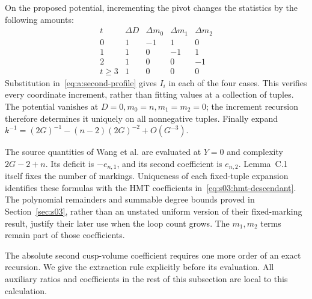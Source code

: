 \begin{prf}
On the proposed potential, incrementing the pivot changes the statistics
by the following amounts:
\[
\begin{array}{c|rrrr}
 t&\Delta D&\Delta m_0&\Delta m_1&\Delta m_2\\\hline
 0&1&-1&1&0\\
 1&1&0&-1&1\\
 2&1&0&0&-1\\
 t\geq3&1&0&0&0
\end{array}
\]
Substitution in~\eqref{eq:a:second-profile} gives $I_i$ in each of
the four cases. This verifies every coordinate increment, rather
than fitting values at a collection of tuples. The potential vanishes
at $D=0,m_0=n,m_1=m_2=0$; the increment recursion therefore determines
it uniquely on all nonnegative tuples. Finally expand
$k^{-1}=(2G)^{-1}-(n-2)(2G)^{-2}+O(G^{-3})$.
\end{prf}

\begin{rmk}[Identification]
The source quantities of Wang et al. are evaluated at $Y=0$ and
complexity $2G-2+n$. Its deficit is $-e_{n,1}$, and its second coefficient
is $e_{n,2}$. Lemma~C.1 itself fixes the number of markings. Uniqueness
of each fixed-tuple expansion identifies these formulas with the HMT
coefficients in~\eqref{eq:s03:hmt-descendant}. The polynomial remainders
and summable degree bounds proved in Section~\ref{sec:s03}, rather than
an unstated uniform version of their fixed-marking result, justify their later use when the
loop count grows. The $m_1,m_2$ terms remain part of those coefficients.
\end{rmk}

The absolute second cusp-volume coefficient requires one more order of
an exact recursion. We give the extraction rule explicitly before its
evaluation. All auxiliary ratios and coefficients in the rest of this
subsection are local to this calculation.

